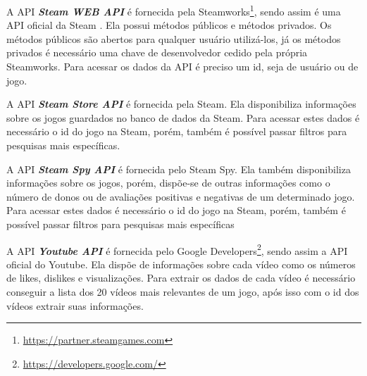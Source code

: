 A API \textit{\textbf{Steam WEB API}} é fornecida pela Steamworks\footnote[4]{\url{https://partner.steamgames.com}}, sendo assim é uma API oficial da Steam \cite{steam_api}. Ela possui métodos públicos e métodos privados. Os métodos públicos são abertos para qualquer usuário utilizá-los, já os métodos privados é necessário uma chave de desenvolvedor cedido pela própria Steamworks. Para acessar os dados da API é preciso um id, seja de usuário ou de jogo.

A API \textit{\textbf{Steam Store API}} é fornecida pela Steam. Ela disponibiliza informações sobre os jogos guardados no banco de dados da Steam. Para acessar estes dados é necessário o id do jogo na Steam, porém, também é possível passar filtros para pesquisas mais específicas.

A API \textit{\textbf{Steam Spy API}} é fornecida pelo Steam Spy. Ela também disponibiliza informações sobre os jogos, porém, dispõe-se de outras informações como o número de donos ou de avaliações positivas e negativas de um determinado jogo. Para acessar estes dados é necessário o id do jogo na Steam, porém, também é possível passar filtros para pesquisas mais específicas

A API \textit{\textbf{Youtube API}} é fornecida pelo Google Developers\footnote[5]{\url{https://developers.google.com/}}, sendo assim a API oficial do Youtube. Ela dispõe de informações sobre cada vídeo como os números de likes, dislikes e visualizações. Para extrair os dados de cada vídeo é necessário conseguir a lista dos 20 vídeos mais relevantes de um jogo, após isso com o id dos vídeos extrair suas informações.

